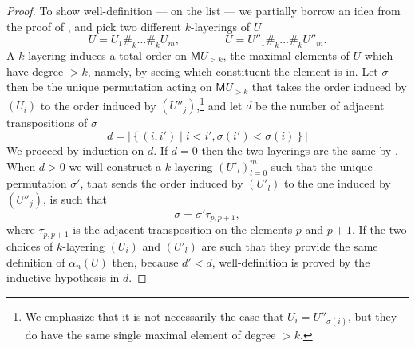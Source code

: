 \documentclass[12pt,a4paper]{article}
\numberwithin{equation}{section}
\begin{document}
\begin{proof}
    To show well-definition ---  on the list --- we partially borrow an idea from the proof of \cite[Lem.\,8.2.13]{hadzihasanovic}, and pick two different $k$-layerings of $U$
    \begin{equation}
        U = U_1 \#_k \dots \#_k U_m,  \qquad \qquad U = U''_1 \#_k \dots \#_k U''_m.
    \end{equation}
    A $k$-layering induces a total order on $\mathsf{M}U_{>k}$, the maximal elements of $U$ which have degree $>k$, namely, by seeing which constituent the element is in. Let $\sigma$ then be the unique permutation acting on $\mathsf{M}U_{>k}$ that takes the order induced by $(U_i)$ to the order induced by $(U''_j)$,\footnote{We emphasize that it is not necessarily the case that $U_{i} = U''_{\sigma(i)}$, but they do have the same single maximal element of degree $> k$.} and let $d$ be the number of adjacent transpositions of $\sigma$
    \begin{equation}
        d = \left| \left\{ (i, i') \mid i < i', \sigma(i') < \sigma(i) \right\} \right|
    \end{equation}
    We proceed by induction on $d$. If $d=0$ then the two layerings are the same by \cite[Prop.\,4.3.11]{hadzihasanovic}. When $d > 0$ we will construct a $k$-layering $(U'_l)_{l=0}^m$ such that the unique permutation $\sigma'$, that sends the order induced by $(U'_l)$ to the one induced by $(U''_j)$, is such that
    \begin{equation}
        \sigma = \sigma' \tau_{p, p+1},
    \end{equation}
    where $\tau_{p, p+1}$ is the adjacent transposition on the elements $p$ and $p+1$. If the two choices of $k$-layering $(U_i)$ and $(U'_l)$ are such that they provide the same definition of $\tilde{\alpha}_n (U)$ then, because $d' < d$, well-definition is proved by the inductive hypothesis in $d$.


\end{proof}
\end{document}
